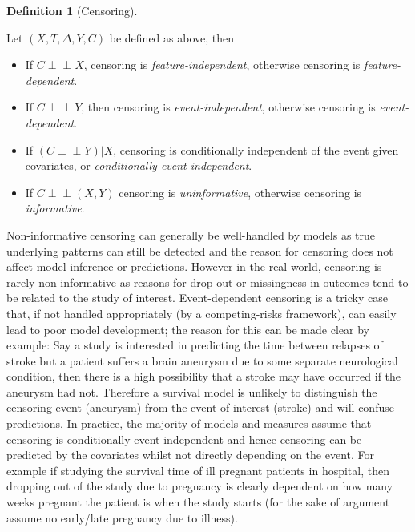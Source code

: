 \documentclass[
  letterpaper,
]{scrbook}
\providecommand{\tightlist}{%
  \setlength{\itemsep}{0pt}\setlength{\parskip}{0pt}}\usepackage{longtable,booktabs,array}
\theoremstyle{plain}
\theoremstyle{definition}
\newtheorem{definition}{Definition}[chapter]
\theoremstyle{remark}
\begin{document}
\leavevmode{}%
\begin{definition}[Censoring]\label{def-cens}

Let \((X,T,\Delta,Y,C)\) be defined as above, then

\begin{itemize}
\tightlist
\item
  If \(C \perp \!\!\! \perp X\), censoring is
  \emph{feature-independent}, otherwise censoring is
  \emph{feature-dependent}.
\item
  If \(C \perp \!\!\! \perp Y\), then censoring is
  \emph{event-independent}, otherwise censoring is
  \emph{event-dependent}.
\item
  If \((C \perp \!\!\! \perp Y) | X\), censoring is conditionally
  independent of the event given covariates, or
  \emph{conditionally event-independent}.
\item
  If \(C \perp \!\!\! \perp(X,Y)\) censoring is \emph{uninformative},
  otherwise censoring is \emph{informative}.
\end{itemize}

\end{definition}

Non-informative censoring can generally be well-handled by models as
true underlying patterns can still be detected and the reason for
censoring does not affect model inference or predictions. However in the
real-world, censoring is rarely non-informative as reasons for drop-out
or missingness in outcomes tend to be related to the study of interest.
Event-dependent censoring is a tricky case that, if not handled
appropriately (by a competing-risks framework), can easily lead to poor
model development; the reason for this can be made clear by example: Say
a study is interested in predicting the time between relapses of stroke
but a patient suffers a brain aneurysm due to some separate neurological
condition, then there is a high possibility that a stroke may have
occurred if the aneurysm had not. Therefore a survival model is unlikely
to distinguish the censoring event (aneurysm) from the event of interest
(stroke) and will confuse predictions. In practice, the majority of
models and measures assume that censoring is conditionally
event-independent and hence censoring can be predicted by the covariates
whilst not directly depending on the event. For example if studying the
survival time of ill pregnant patients in hospital, then dropping out of
the study due to pregnancy is clearly dependent on how many weeks
pregnant the patient is when the study starts (for the sake of argument
assume no early/late pregnancy due to illness).
\end{document}
